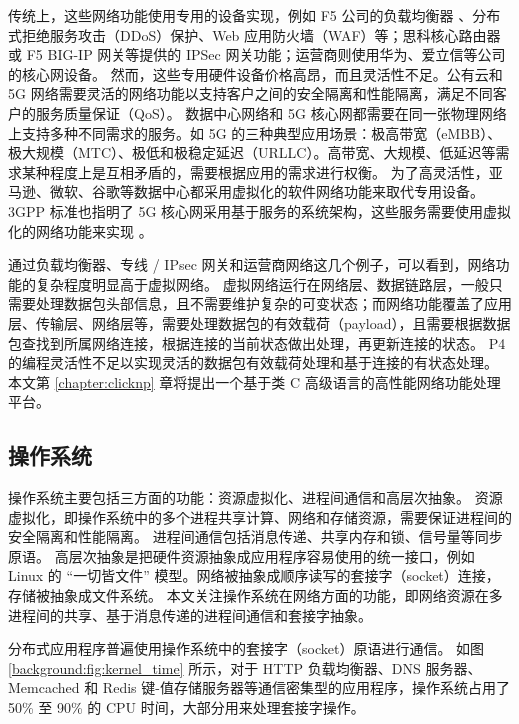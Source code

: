 传统上，这些网络功能使用专用的设备实现，例如 F5 公司的负载均衡器 \cite{f5-load-balancer}、分布式拒绝服务攻击（DDoS）保护、Web 应用防火墙（WAF）等；思科核心路由器或 F5 BIG-IP 网关等提供的 IPSec 网关功能；运营商则使用华为、爱立信等公司的核心网设备。
然而，这些专用硬件设备价格高昂，而且灵活性不足。公有云和 5G 网络需要灵活的网络功能以支持客户之间的安全隔离和性能隔离，满足不同客户的服务质量保证（QoS）。
数据中心网络和 5G 核心网都需要在同一张物理网络上支持多种不同需求的服务。如 5G 的三种典型应用场景：极高带宽（eMBB）、极大规模（MTC）、极低和极稳定延迟（URLLC）。高带宽、大规模、低延迟等需求某种程度上是互相矛盾的，需要根据应用的需求进行权衡。
为了高灵活性，亚马逊、微软、谷歌等数据中心都采用虚拟化的软件网络功能来取代专用设备。3GPP 标准也指明了 5G 核心网采用基于服务的系统架构，这些服务需要使用虚拟化的网络功能来实现 \cite{3gpp-23501,3gpp-38300}。

通过负载均衡器、专线 / IPsec 网关和运营商网络这几个例子，可以看到，网络功能的复杂程度明显高于虚拟网络。
虚拟网络运行在网络层、数据链路层，一般只需要处理数据包头部信息，且不需要维护复杂的可变状态；而网络功能覆盖了应用层、传输层、网络层等，需要处理数据包的有效载荷（payload），且需要根据数据包查找到所属网络连接，根据连接的当前状态做出处理，再更新连接的状态。
P4 \cite{bosshart2013forwarding} 的编程灵活性不足以实现灵活的数据包有效载荷处理和基于连接的有状态处理。
本文第 \ref{chapter:clicknp} 章将提出一个基于类 C 高级语言的高性能网络功能处理平台。





\subsection{操作系统}

操作系统主要包括三方面的功能：资源虚拟化、进程间通信和高层次抽象。
资源虚拟化，即操作系统中的多个进程共享计算、网络和存储资源，需要保证进程间的安全隔离和性能隔离。
进程间通信包括消息传递、共享内存和锁、信号量等同步原语。
高层次抽象是把硬件资源抽象成应用程序容易使用的统一接口，例如 Linux 的 ``一切皆文件'' 模型。网络被抽象成顺序读写的套接字（socket）连接，存储被抽象成文件系统。
本文关注操作系统在网络方面的功能，即网络资源在多进程间的共享、基于消息传递的进程间通信和套接字抽象。

分布式应用程序普遍使用操作系统中的套接字（socket）原语进行通信。
如图 \ref{background:fig:kernel_time} 所示，对于 HTTP 负载均衡器、DNS 服务器、Memcached \cite{memcached} 和 Redis \cite{redis} 键-值存储服务器等通信密集型的应用程序，操作系统占用了 50\% 至 90\% 的 CPU 时间，大部分用来处理套接字操作。



